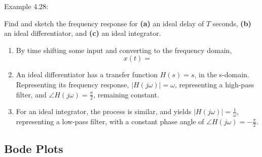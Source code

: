 \documentclass{article}
\begin{document}
Example 4.28: 

Find and sketch the frequency response for \textbf{(a)} an ideal delay of \(T\) seconds, \textbf{(b)} an ideal differentiator, and \textbf{(c)} an ideal integrator.

\begin{enumerate}[label=\alph*)]
	\item By time shifting some input and converting to the frequency domain,
		\[
		  x(t) = 
		\]
	\item An ideal differentiator has a transfer function \(H(s) = s\), in the s-domain. Representing its frequency response, \(|H(j\omega)| = \omega\), representing a high-pass filter, and \(\angle{H(j\omega)} = \frac{\pi}{2}\), remaining constant.
	\item For an ideal integrator, the process is similar, and yields \(|H(j\omega)| = \frac{1}{\omega}\), representing a low-pass filter, with a constant phase angle of \(\angle{H(j\omega)} = -\frac{\pi}{2}\).
\end{enumerate}
\setcounter{subsection}{8}
\subsection{Bode Plots}
\end{document}

